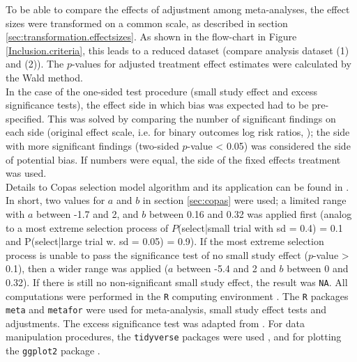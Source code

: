 \documentclass[11pt,a4paper,twoside]{book}\usepackage[]{graphicx}\usepackage[]{color}
\begin{document}
To be able to compare the effects of adjustment among meta-analyses, the effect sizes were transformed on a common scale, as described in section \ref{sec:transformation.effectsizes}. As shown in the flow-chart in Figure \ref{Inclusion.criteria}, this leads to a reduced dataset (compare analysis dataset (1) and (2)). The $p$-values for adjusted treatment effect estimates were calculated by the Wald method. \\
In the case of the one-sided test procedure (small study effect and excess significance tests), the effect side in which bias was expected had to be pre-specified. This was solved by comparing the number of significant findings on each side (original effect scale, i.e. for binary outcomes log risk ratios, \etc); the side with more significant findings (two-sided $p$-value < 0.05) was considered the side of potential bias. If numbers were equal, the side of the fixed effects treatment was used. \\
Details to Copas selection model algorithm and its application can be found in \citet{limitmeta}. In short, two values for $a$ and $b$ in section \ref{sec:copas} were used; a limited range with $a$ between -1.7 and 2, and $b$ between 0.16 and 0.32 was applied first (analog to a most extreme selection process of $P$(select|small trial with sd = 0.4) = 0.1 and P(select|large trial w. sd  = 0.05) = 0.9). If the most extreme selection process is unable to pass the significance test of no small study effect ($p$-value > 0.1), then a wider range was applied ($a$  between -5.4 and 2 and $b$ between 0 and 0.32). If there is still no non-significant small study effect, the result was \texttt{NA}.
All computations were performed in the \texttt{R} computing environment \citep{R.base}. The \texttt{R} packages \texttt{meta} \citep{meta.package} and \texttt{metafor} \citep{metafor.package} were used for meta-analysis, small study effect tests and adjustments. The excess significance test was adapted from \citet{vanAert.2019}. For data manipulation procedures, the \texttt{tidyverse} packages were used \citep{tidyverse.package}, and for plotting the \texttt{ggplot2} package \citep{ggplot2}.\\






\end{document}
